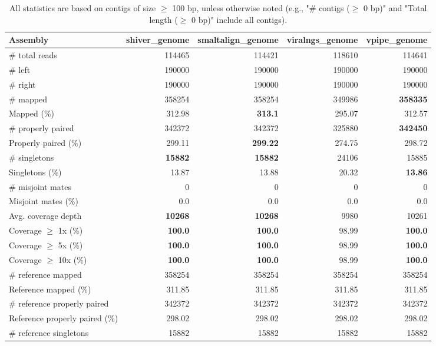 \documentclass[12pt,a4paper]{article}
\begin{document}
\begin{table}[ht]
\begin{center}
\caption{All statistics are based on contigs of size $\geq$ 100 bp, unless otherwise noted (e.g., "\# contigs ($\geq$ 0 bp)" and "Total length ($\geq$ 0 bp)" include all contigs).}
\begin{tabular}{|l*{4}{|r}|}
\hline
Assembly & shiver\_genome & smaltalign\_genome & viralngs\_genome & vpipe\_genome \\ \hline
\# total reads & 114465 & 114421 & 118610 & 114641 \\ \hline
\# left & 190000 & 190000 & 190000 & 190000 \\ \hline
\# right & 190000 & 190000 & 190000 & 190000 \\ \hline
\# mapped & 358254 & 358254 & 349986 & {\bf 358335} \\ \hline
Mapped (\%) & 312.98 & {\bf 313.1} & 295.07 & 312.57 \\ \hline
\# properly paired & 342372 & 342372 & 325880 & {\bf 342450} \\ \hline
Properly paired (\%) & 299.11 & {\bf 299.22} & 274.75 & 298.72 \\ \hline
\# singletons & {\bf 15882} & {\bf 15882} & 24106 & 15885 \\ \hline
Singletons (\%) & 13.87 & 13.88 & 20.32 & {\bf 13.86} \\ \hline
\# misjoint mates & 0 & 0 & 0 & 0 \\ \hline
Misjoint mates (\%) & 0.0 & 0.0 & 0.0 & 0.0 \\ \hline
Avg. coverage depth & {\bf 10268} & {\bf 10268} & 9980 & 10261 \\ \hline
Coverage $\geq$ 1x (\%) & {\bf 100.0} & {\bf 100.0} & 98.99 & {\bf 100.0} \\ \hline
Coverage $\geq$ 5x (\%) & {\bf 100.0} & {\bf 100.0} & 98.99 & {\bf 100.0} \\ \hline
Coverage $\geq$ 10x (\%) & {\bf 100.0} & {\bf 100.0} & 98.99 & {\bf 100.0} \\ \hline
\# reference mapped & 358254 & 358254 & 358254 & 358254 \\ \hline
Reference mapped (\%) & 311.85 & 311.85 & 311.85 & 311.85 \\ \hline
\# reference properly paired & 342372 & 342372 & 342372 & 342372 \\ \hline
Reference properly paired (\%) & 298.02 & 298.02 & 298.02 & 298.02 \\ \hline
\# reference singletons & 15882 & 15882 & 15882 & 15882 \\ \hline

\end{tabular}
\end{center}
\end{table}
\end{document}
